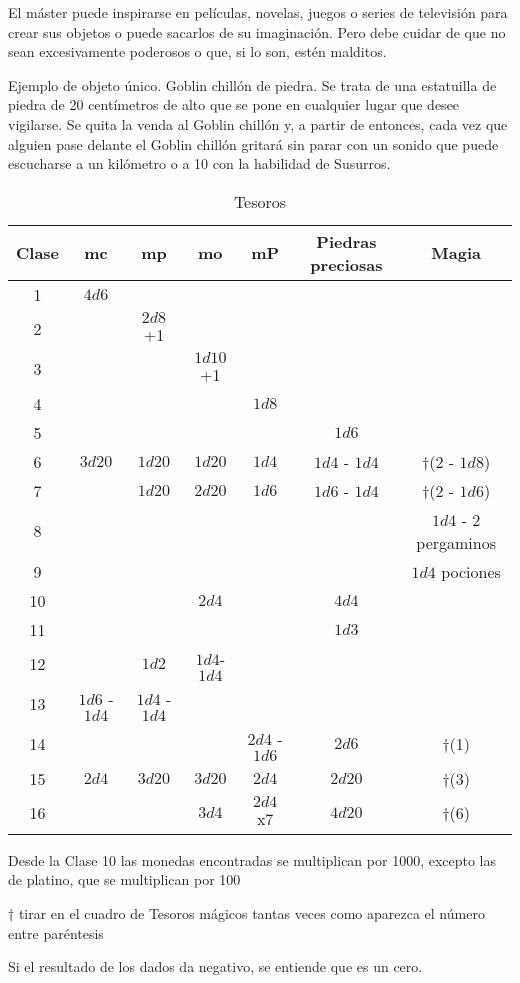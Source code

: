 \begin{multicols}{2}
El máster puede inspirarse en películas, novelas, juegos o series de televisión
para crear sus objetos o puede sacarlos de su imaginación. Pero debe cuidar de que
no sean excesivamente poderosos o que, si lo son, estén malditos.

Ejemplo de objeto único. Goblin chillón de piedra. Se trata de una estatuilla de
piedra de 20 centímetros de alto que se pone en cualquier lugar que desee vigilarse.
Se quita la venda al Goblin chillón y, a partir de entonces, cada vez que alguien
pase delante el Goblin chillón gritará sin parar con un sonido que puede escucharse
a un kilómetro o a 10 con la habilidad de Susurros.

\begin{table*}[p]
\caption{Tesoros}
\centering
\begin{threeparttable}
\begin{tabular}{ccccccc}
\toprule
Clase & mc  & mp  & mo  & mP  & Piedras preciosas & Magia\\
\midrule
1 & $ 4d6$ \\
2 & & $ 2d8$+1\\
3 & & & $ 1d10$+1\\
4 & & & & $ 1d8$\\
5 & & & & & $ 1d6$\\
6 & $ 3d20$ & $ 1d20$ & $ 1d20$ & $ 1d4$  & $ 1d4$ - $ 1d4$  & †(2 - $ 1d8$)\\
7 &  & $ 1d20$ & $ 2d20$ & $ 1d6$ & $ 1d6$ - $ 1d4$ & †(2 - $ 1d6$)\\
8 &  &  &  & & &  $ 1d4$ - 2 pergaminos\\
9 &  &  &  & & &  $ 1d4$ pociones\\
10 &  &  & $ 2d4$ & & $ 4d4$  \\
11 &  &  &  & & $ 1d3$  \\
12 &  & $ 1d2$  & $ 1d4$-$ 1d4$   \\
13 & $ 1d6$ - $ 1d4$ & $ 1d4$ - $ 1d4$  \\
14 &   &  &  & $ 2d4$ - $ 1d6$ & $ 2d6$  & †(1) \\
15 & $ 2d4$ & $ 3d20$ & $ 3d20$ & $ 2d4$ & $ 2d20$& †(3)\\
16 &  &  &   $ 3d4$ & $ 2d4$x7 & $ 4d20$ & †(6)\\
\bottomrule
\end{tabular}
\begin{tablenotes}
\item Desde la Clase 10 las monedas encontradas se multiplican por 1000, excepto las de platino, que se multiplican por 100
\item † tirar en el cuadro de Tesoros mágicos tantas veces como aparezca el número entre paréntesis
\item Si el resultado de los dados da negativo, se entiende que es un cero.
\item
\end{tablenotes}
\end{threeparttable}
\end{table*}


\end{multicols}
